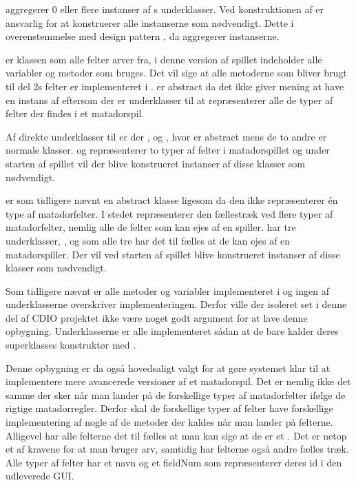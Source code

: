  aggregerer 0 eller flere instanser af s underklasser. Ved konstruktionen af  er  ansvarlig for at konstruerer alle instanserne som nødvendigt. Dette i overenstemmelse med design pattern , da  aggregerer instanserne.

 er klassen som alle felter arver fra, i denne version af spillet indeholder  alle variabler og metoder som bruges. Det vil sige at alle metoderne som bliver brugt til del 2s felter er implementeret i .  er abstract da det ikke giver mening at have en instans af  eftersom der er underklasser til at repræsenterer alle de typer af felter der findes i et matadorspil.

Af direkte underklasser til  er der ,  og , hvor  er abstract mens de to andre er normale klasser.  og  repræsenterer to typer af felter i matadorspillet og under starten af spillet vil der blive konstrueret instanser af disse klasser som nødvendigt.

 er som tidligere nævnt en abstract klasse ligesom  da den ikke repræsenterer én type af matadorfelter. I stedet repræsenterer den fællestræk ved flere typer af matadorfelter, nemlig alle de felter som kan ejes af en spiller.  har tre underklasser, ,  og  som alle tre har det til fælles at de kan ejes af en matadorspiller. Der vil ved starten af spillet blive konstrueret instanser af disse klasser som nødvendigt.

Som tidligere nævnt er alle metoder og variabler implementeret i  og ingen af underklasserne overskriver implementeringen. Derfor ville der isoleret set i denne del af CDIO projektet ikke være noget godt argument for at lave denne opbygning. Underklasserne er alle implementeret sådan at de bare kalder deres superklasses konstruktør med .

Denne opbygning er da også hovedsaligt valgt for at gøre systemet klar til at implementere mere avancerede versioner af et matadorspil. Det er nemlig ikke det samme der sker når man lander på de forskellige typer af matadorfelter ifølge de rigtige matadorregler. Derfor skal de forskellige typer af felter have forskellige implementering af nogle af de metoder der kaldes når man lander på felterne. Alligevel har alle felterne det til fælles at man kan sige at de er et . Det er netop et af kravene for at man bruger arv, samtidig har felterne også andre fælles træk. Alle typer af felter har et navn og et fieldNum som repræsenterer deres id i den udleverede GUI.

